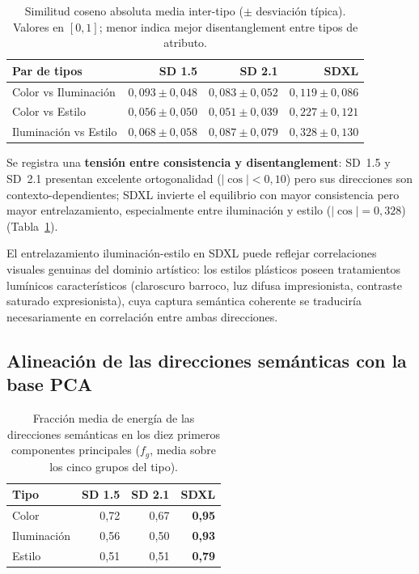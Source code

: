 \documentclass[12pt, a4paper, twoside]{book}
\begin{document}
\begin{table}[htb]
\centering
\caption{Similitud coseno absoluta media inter-tipo ($\pm$ desviación típica).
Valores en $[0, 1]$; menor indica mejor disentanglement entre tipos de atributo.}
\label{tab:ortogonalidad}
\small
\begin{tabular}{lrrr}
\toprule
\textbf{Par de tipos} & \textbf{SD 1.5} & \textbf{SD 2.1} & \textbf{SDXL} \\
\midrule
Color vs Iluminación  & $0{,}093 \pm 0{,}048$ & $0{,}083 \pm 0{,}052$ & $0{,}119 \pm 0{,}086$ \\
Color vs Estilo       & $0{,}056 \pm 0{,}050$ & $0{,}051 \pm 0{,}039$ & $0{,}227 \pm 0{,}121$ \\
Iluminación vs Estilo & $0{,}068 \pm 0{,}058$ & $0{,}087 \pm 0{,}079$ & $0{,}328 \pm 0{,}130$ \\
\bottomrule
\end{tabular}
\end{table}

Se registra una \textbf{tensión entre consistencia y disentanglement}: SD~1.5 y SD~2.1
presentan excelente ortogonalidad ($|\cos| < 0{,}10$) pero sus direcciones son
contexto-dependientes; SDXL invierte el equilibrio con mayor consistencia pero mayor
entrelazamiento, especialmente entre iluminación y estilo ($|\cos| = 0{,}328$)
(Tabla~\ref{tab:ortogonalidad}).

El entrelazamiento iluminación-estilo en SDXL puede reflejar correlaciones visuales genuinas
del dominio artístico: los estilos plásticos poseen tratamientos lumínicos característicos
(claroscuro barroco, luz difusa impresionista, contraste saturado expresionista), cuya
captura semántica coherente se traduciría necesariamente en correlación entre ambas
direcciones.

\subsection{Alineación de las direcciones semánticas con la base PCA}
\label{subsec:res:energia_pca}

\begin{table}[htb]
\centering
\caption{Fracción media de energía de las direcciones semánticas en los diez primeros
componentes principales ($f_g$, media sobre los cinco grupos del tipo).}
\label{tab:energia_pca}
\small
\begin{tabular}{lrrr}
\toprule
\textbf{Tipo} & \textbf{SD 1.5} & \textbf{SD 2.1} & \textbf{SDXL} \\
\midrule
Color       & 0,72 & 0,67 & \textbf{0,95} \\
Iluminación & 0,56 & 0,50 & \textbf{0,93} \\
Estilo      & 0,51 & 0,51 & \textbf{0,79} \\
\bottomrule
\end{tabular}
\end{table}
\end{document}
